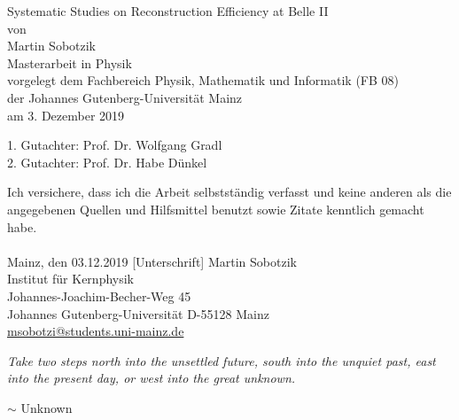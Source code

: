\documentclass[a4paper,11pt,twosided,final,german,openbib,pdftex,listof=totoc,bibliography=totoc]{scrbook}
\newcommand\blankpage{%
	\null
	\thispagestyle{empty}%
	\addtocounter{page}{-1}%
	\newpage}
\begin{document}

\begin{titlepage}
  \vspace*{6mm}
  \begin{center}
     {\afont Systematic Studies on Reconstruction Efficiency at Belle II}
     \\[3.5cm]
     {\large von}
     \\[3.5cm]
     {\dfont Martin Sobotzik}
     \\[2cm]
     {\large Masterarbeit in Physik \/\\
        vorgelegt dem Fachbereich Physik, Mathematik und Informatik (FB 08) \/\\
        der Johannes Gutenberg-Universit\"at Mainz \/\\
        am 3. Dezember 2019}
   \end{center}
   \vfill
   1. Gutachter: Prof. Dr. Wolfgang Gradl\\	
   2. Gutachter: Prof. Dr. Habe D\"unkel \\
   \vfill

\afterpage{\blankpage}


\end{titlepage}
\newpage


 

\thispagestyle{empty}
Ich versichere, dass ich die Arbeit selbstst\"andig verfasst und keine 
anderen als die angegebenen Quellen und Hilfsmittel benutzt sowie 
Zitate kenntlich gemacht habe.
\\
\\[3.5cm] 
Mainz, den 03.12.2019 [Unterschrift]
\vfill
\noindent 
Martin Sobotzik\\
Institut f\"ur Kernphysik\\
Johannes-Joachim-Becher-Weg 45\\
Johannes Gutenberg-Universit\"at
D-55128 Mainz\\
{\href{msobotzi@students.uni-mainz.de}{msobotzi@students.uni-mainz.de}}




\afterpage{\blankpage}

\newpage

\epigraph{\textit{Take two steps north into the unsettled future, south into the unquiet past, east into the present day, or west into the great unknown.}}{$\sim$ Unknown}
\end{document}
